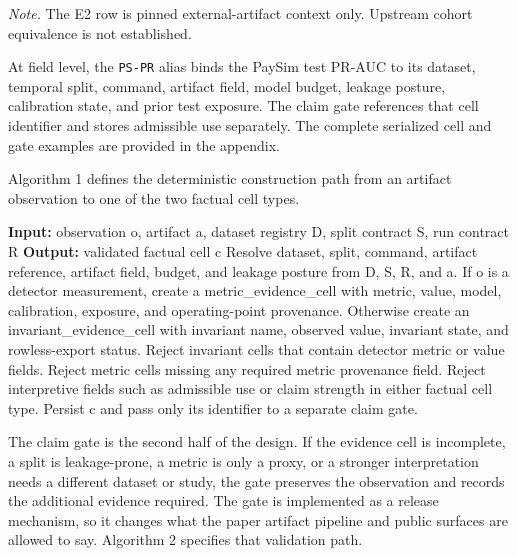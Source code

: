 \documentclass[11pt]{article}
\begin{document}
\emph{Note.} The E2 row is pinned external-artifact context only. Upstream cohort equivalence is not established.

At field level, the \nolinkurl{PS-PR} alias binds the PaySim test PR-AUC to its dataset, temporal split, command, artifact field, model budget, leakage posture, calibration state, and prior test exposure. The claim gate references that cell identifier and stores admissible use separately. The complete serialized cell and gate examples are provided in the appendix.

Algorithm 1 defines the deterministic construction path from an artifact observation to one of the two factual cell types.

\begin{algorithm}[H]
\caption{Typed evidence-cell creation}
\begin{algorithmic}[1]
\State \textbf{Input:} observation o, artifact a, dataset registry D, split contract S, run contract R
\State \textbf{Output:} validated factual cell c
\State Resolve dataset, split, command, artifact reference, artifact field, budget, and leakage posture from D, S, R, and a.
\State If o is a detector measurement, create a metric\_evidence\_cell with metric, value, model, calibration, exposure, and operating-point provenance.
\State Otherwise create an invariant\_evidence\_cell with invariant name, observed value, invariant state, and rowless-export status.
\State Reject invariant cells that contain detector metric or value fields.
\State Reject metric cells missing any required metric provenance field.
\State Reject interpretive fields such as admissible use or claim strength in either factual cell type.
\State Persist c and pass only its identifier to a separate claim gate.
\end{algorithmic}
\end{algorithm}


The claim gate is the second half of the design. If the evidence cell is incomplete, a split is leakage-prone, a metric is only a proxy, or a stronger interpretation needs a different dataset or study, the gate preserves the observation and records the additional evidence required. The gate is implemented as a release mechanism, so it changes what the paper artifact pipeline and public surfaces are allowed to say. Algorithm 2 specifies that validation path.
\end{document}
